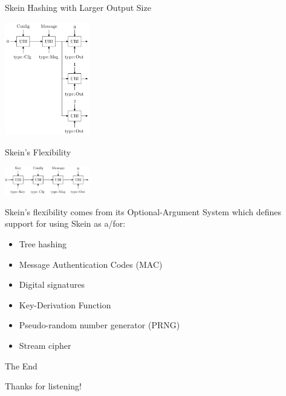 \documentclass{beamer}
\begin{document}
\begin{frame}{Skein Hashing with Larger Output Size}

	\begin{center}\includegraphics[width=140px]{skein-large}\end{center}

\end{frame}

\begin{frame}{Skein's Flexibility}

	\begin{center}\includegraphics[width=140px]{skein-mac}\end{center}

	Skein's flexibility comes from its Optional-Argument System which defines support for using Skein as a/for:

	\vspace{2mm}
	\begin{itemize}
		\item Tree hashing
		\item Message Authentication Codes (MAC)
		\item Digital signatures
		\item Key-Derivation Function
		\item Pseudo-random number generator (PRNG)
		\item Stream cipher
	\end{itemize}

\end{frame}

\begin{frame}{The End}

	Thanks for listening!

\end{frame}
\end{document}
